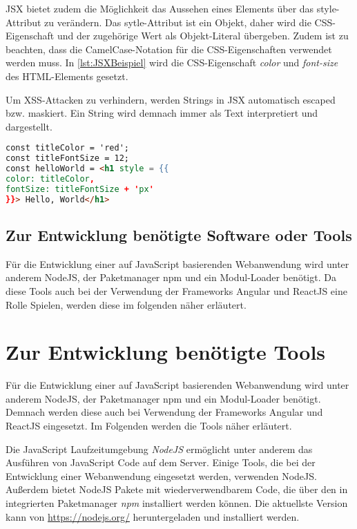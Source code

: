 JSX bietet zudem die Möglichkeit das Aussehen eines Elements über das style-Attribut zu verändern. Das sytle-Attribut ist ein Objekt, daher wird die CSS-Eigenschaft und der zugehörige Wert als Objekt-Literal übergeben. Zudem ist zu beachten, dass die CamelCase-Notation für die CSS-Eigenschaften verwendet werden muss. In \autoref{lst:JSXBeispiel} wird die CSS-Eigenschaft \textit{color} und \textit{font-size} des HTML-Elements gesetzt.

Um XSS-Attacken zu verhindern, werden Strings in JSX automatisch escaped bzw. maskiert. Ein String wird demnach immer als Text interpretiert und dargestellt.\autocites[vgl.][59\psqq]{Zeigermann.2016}[vgl.][65\psqq]{Stefanov.2017} 

\begin{lstlisting}[caption=Beispiel für die Verwendung von JSX, label=lst:JSXBeispiel, language=HTML]
const titleColor = 'red';
const titleFontSize = 12;
const helloWorld = <h1 style = {{
color: titleColor,
fontSize: titleFontSize + 'px'
}}> Hello, World</h1>
\end{lstlisting}



\subsection{Zur Entwicklung benötigte Software oder Tools}\label{sec:glTools}
Für die Entwicklung einer auf JavaScript basierenden Webanwendung wird unter anderem NodeJS, der Paketmanager npm und ein Modul-Loader benötigt. Da diese Tools auch bei der Verwendung der Frameworks Angular und ReactJS eine Rolle Spielen, werden diese  im folgenden näher erläutert.
\section{Zur Entwicklung benötigte Tools}
Für die Entwicklung einer auf JavaScript basierenden Webanwendung wird unter anderem NodeJS, der Paketmanager npm und ein Modul-Loader benötigt. Demnach werden diese auch bei Verwendung der Frameworks Angular und ReactJS eingesetzt. Im Folgenden werden die Tools näher erläutert.

\label{NodeJS}
Die JavaScript Laufzeitumgebung \textit{NodeJS} ermöglicht unter anderem das Ausführen von JavaScript Code auf dem Server. Einige Tools, die bei der Entwicklung einer Webanwendung eingesetzt werden, verwenden NodeJS. Außerdem bietet NodeJS Pakete mit wiederverwendbarem Code, die über den in integrierten Paketmanager \textit{npm} installiert werden können. Die aktuellste Version kann von \url{https://nodejs.org/} heruntergeladen und installiert werden.  \autocites[vgl.][1\psqq]{Steyer.2017}[vgl.][7\psqq]{Freeman.2018}[vgl.][6\psqq]{Woiwode.2018} 

